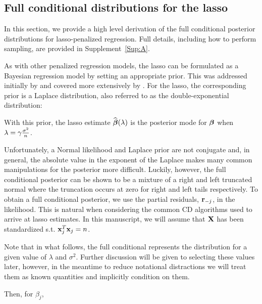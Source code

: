 \subsection{Full conditional distributions for the lasso}
\label{Sec:full-cond}


In this section, we provide a high level derivation of the full conditional posterior distributions for lasso-penalized regression. Full details, including how to perform sampling, are provided in Supplement~\ref{Sup:A}. 

As with other penalized regression models, the lasso can be formulated as a Bayesian regression model by setting an appropriate prior. This was addressed initially by \cite{Tibshirani1996} and covered more extensively by \cite{Park2008}. For the lasso, the corresponding prior is a Laplace distribution, also referred to as the double-exponential distribution:


With this prior, the lasso estimate $\widehat{\boldsymbol{\beta}}(\lambda)$ is the posterior mode for $\boldsymbol{\beta}$ when $\lambda = \gamma \frac{\sigma^2}{n}$.

Unfortunately, a Normal likelihood and Laplace prior are not conjugate and, in general, the absolute value in the exponent of the Laplace makes many common manipulations for the posterior more difficult. Luckily, however, the full conditional posterior can be shown to be a mixture of a right and left truncated normal where the truncation occurs at zero for right and left tails respectively. To obtain a full conditional posterior, we use the partial residuals, $\mathbf{r}_{-j}$, in the likelihood. This is natural when considering the common CD algorithms used to arrive at lasso estimates. In this manuscript, we will assume that $\mathbf{X}$ has been standardized s.t. $\mathbf{x}_j^T\mathbf{x}_j = n$.

Note that in what follows, the full conditional represents the distribution for a given value of $\lambda$ and $\sigma^2$. Further discussion will be given to selecting these values later, however, in the meantime to reduce notational distractions we will treat them as known quantities and implicitly condition on them.

Then, for $\beta_j$,


